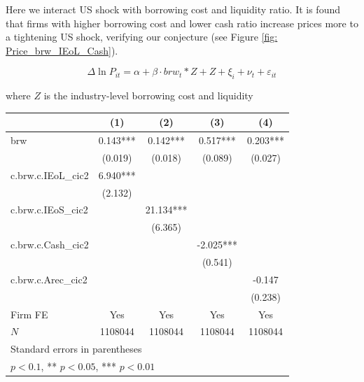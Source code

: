 \documentclass[12pt]{article}
\begin{document}
Here we interact US shock with borrowing cost and liquidity ratio. It is found that firms with higher borrowing cost and lower cash ratio increase prices more to a tightening US shock, verifying our conjecture (see Figure \ref{fig: Price_brw_IEoL_Cash}). 

$$
\Delta \ln P_{it} = \alpha +\beta \cdot brw_{t}*Z+Z+\xi_{i}+\nu_{t}+\varepsilon_{i t} 
$$

where $Z$ is the industry-level borrowing cost and liquidity

\begin{center}
\begin{tabular}{l*{4}{c}}
\toprule
            &\multicolumn{1}{c}{(1)}         &\multicolumn{1}{c}{(2)}         &\multicolumn{1}{c}{(3)}         &\multicolumn{1}{c}{(4)}         \\
\midrule
brw         &       0.143***&       0.142***&       0.517***&       0.203***\\
            &     (0.019)         &     (0.018)         &     (0.089)         &     (0.027)         \\
\addlinespace
c.brw.c.IEoL\_cic2&       6.940***&                     &                     &                     \\
            &     (2.132)         &                     &                     &                     \\
\addlinespace
c.brw.c.IEoS\_cic2&                     &      21.134***&                     &                     \\
            &                     &     (6.365)         &                     &                     \\
\addlinespace
c.brw.c.Cash\_cic2&                     &                     &      -2.025***&                     \\
            &                     &                     &     (0.541)         &                     \\
\addlinespace
c.brw.c.Arec\_cic2&                     &                     &                     &      -0.147         \\
            &                     &                     &                     &     (0.238)         \\
\addlinespace
Firm FE     &         Yes         &         Yes         &         Yes         &         Yes         \\
\midrule
\(N\)       &     1108044         &     1108044         &     1108044         &     1108044         \\
\bottomrule
\multicolumn{5}{l}{\footnotesize Standard errors in parentheses}\\
\multicolumn{5}{l}{\footnotesize * \(p<0.1\), ** \(p<0.05\), *** \(p<0.01\)}\\
\end{tabular}

\end{center}
\end{document}
